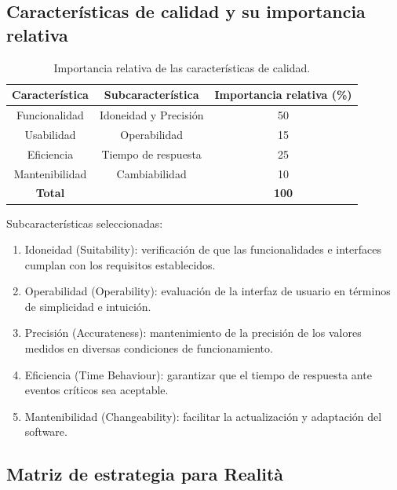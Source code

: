 \documentclass[12pt,a4paper, twoside]{article} %
\begin{document}
\subsection{Características de calidad y su importancia relativa}
\label{sec:org24980a8}

\begin{table}[ht]
\centering
\begin{tabular}{|c| c| c|}
\hline
\textbf{Característica} & \textbf{Subcaracterística} & \textbf{Importancia relativa (\%)} \\
\hline
Funcionalidad & Idoneidad y Precisión  & 50 \\
Usabilidad & Operabilidad & 15 \\
Eficiencia & Tiempo de respuesta & 25 \\
Mantenibilidad & Cambiabilidad & 10 \\
\hline
\textbf{Total} & & \textbf{100} \\
\hline
\end{tabular}
\caption{Importancia relativa de las características de calidad.}

\label{tab:caracteristicas_calidad}
\end{table}

Subcaracterísticas seleccionadas:

\begin{enumerate}

\item Idoneidad (Suitability): verificación de que las funcionalidades e interfaces cumplan con los requisitos establecidos.

\item Operabilidad (Operability): evaluación de la interfaz de usuario en términos de simplicidad e intuición.

\item Precisión (Accurateness): mantenimiento de la precisión de los valores medidos en diversas condiciones de funcionamiento.

\item Eficiencia (Time Behaviour): garantizar que el tiempo de respuesta ante eventos críticos sea aceptable.

\item Mantenibilidad (Changeability): facilitar la actualización y adaptación del software.

\end{enumerate}

\subsection{Matriz de estrategia para Realità}
\label{sec:org24980a8}
\end{document}
